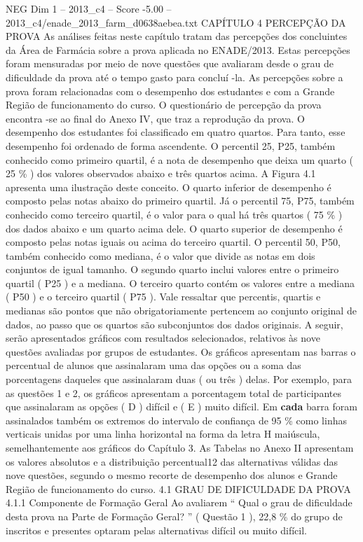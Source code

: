 \begin{textsample}{NEG Dim 1 – 2013\_c4 – Score -5.00 – 2013\_c4/enade\_2013\_farm\_d0638aebea.txt}  \label{ex:f1_neg_058}
CAPÍTULO 4 PERCEPÇÃO DA PROVA As análises feitas neste capítulo tratam das percepções dos concluintes da Área de Farmácia sobre a prova aplicada no ENADE/2013.
Estas percepções foram mensuradas por meio de nove questões que avaliaram desde o grau de dificuldade da prova até o tempo gasto para concluí -la.
As percepções sobre a prova foram relacionadas com o desempenho dos estudantes e com a Grande Região de funcionamento do curso.
O questionário de percepção da prova encontra -se ao final do Anexo IV, que traz a reprodução da prova.
O desempenho dos estudantes foi classificado em quatro quartos.
Para tanto, esse desempenho foi ordenado de forma ascendente.
O percentil 25, P25, também conhecido como primeiro quartil, é a nota de desempenho que deixa um quarto ( 25 \% ) dos valores observados abaixo e três quartos acima.
A Figura 4.1 apresenta uma ilustração deste conceito.
O quarto inferior de desempenho é composto pelas notas abaixo do primeiro quartil.
Já o percentil 75, P75, também conhecido como terceiro quartil, é o valor para o qual há três quartos ( 75 \% ) dos dados abaixo e um quarto acima dele.
O quarto superior de desempenho é composto pelas notas iguais ou acima do terceiro quartil.
O percentil 50, P50, também conhecido como mediana, é o valor que divide as notas em dois conjuntos de igual tamanho.
O segundo quarto inclui valores entre o primeiro quartil ( P25 ) e a mediana.
O terceiro quarto contém os valores entre a mediana ( P50 ) e o terceiro quartil ( P75 ).
Vale ressaltar que percentis, quartis e medianas são pontos que não obrigatoriamente pertencem ao conjunto original de dados, ao passo que os quartos são subconjuntos dos dados originais.
A seguir, serão apresentados gráficos com resultados selecionados, relativos às nove questões avaliadas por grupos de estudantes.
Os gráficos apresentam nas barras o percentual de alunos que assinalaram uma das opções ou a soma das porcentagens daqueles que assinalaram duas ( ou três ) delas.
Por exemplo, para as questões 1 e 2, os gráficos apresentam a porcentagem total de participantes que assinalaram as opções ( D ) difícil e ( E ) muito difícil.
Em \textbf{cada} barra foram assinalados também os extremos do intervalo de confiança de 95 \% como linhas verticais unidas por uma linha horizontal na forma da letra H maiúscula, semelhantemente aos gráficos do Capítulo 3.
As Tabelas no Anexo II apresentam os valores absolutos e a distribuição percentual12 das alternativas válidas das nove questões, segundo o mesmo recorte de desempenho dos alunos e Grande Região de funcionamento do curso. 4.1 GRAU DE DIFICULDADE DA PROVA 4.1.1 Componente de Formação Geral Ao avaliarem “ Qual o grau de dificuldade desta prova na Parte de Formação Geral? ” ( Questão 1 ), 22,8 \% do grupo de inscritos e presentes optaram pelas alternativas difícil ou muito difícil.

\end{textsample}
